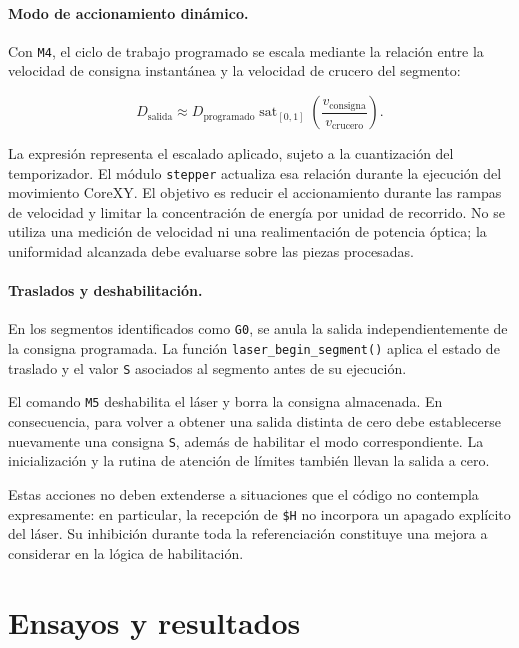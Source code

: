\documentclass[blue,fullpaper]{ludusofficial}  %
\begin{document}
\paragraph{Modo de accionamiento dinámico.}
Con \texttt{M4}, el ciclo de trabajo programado
se escala mediante la relación entre la velocidad
de consigna instantánea y la velocidad de crucero
del segmento:

\begin{equation}
    D_{\mathrm{salida}} \approx D_{\mathrm{programado}}
    \operatorname{sat}_{[0,1]}
    \left(\frac{v_{\mathrm{consigna}}}{v_{\mathrm{crucero}}}\right).
\end{equation}

La expresión representa el escalado aplicado,
sujeto a la cuantización del temporizador.
El módulo \texttt{stepper} actualiza esa relación
durante la ejecución del movimiento CoreXY.
El objetivo es reducir el accionamiento durante
las rampas de velocidad y limitar la concentración
de energía por unidad de recorrido. No se utiliza
una medición de velocidad ni una realimentación
de potencia óptica; la uniformidad alcanzada
debe evaluarse sobre las piezas procesadas.

\paragraph{Traslados y deshabilitación.}
En los segmentos identificados como \texttt{G0},
se anula la salida independientemente de la consigna
programada. La función \texttt{laser\_begin\_segment()}
aplica el estado de traslado y el valor \texttt{S}
asociados al segmento antes de su ejecución.

El comando \texttt{M5} deshabilita el láser y borra
la consigna almacenada. En consecuencia, para volver
a obtener una salida distinta de cero debe establecerse
nuevamente una consigna \texttt{S}, además de habilitar
el modo correspondiente. La inicialización y la rutina
de atención de límites también llevan la salida a cero.

Estas acciones no deben extenderse a situaciones
que el código no contempla expresamente: en particular,
la recepción de \texttt{\$H} no incorpora un apagado
explícito del láser. Su inhibición durante toda la
referenciación constituye una mejora a considerar
en la lógica de habilitación.

\section{Ensayos y resultados}
\label{sec:ensayos}
\end{document}
